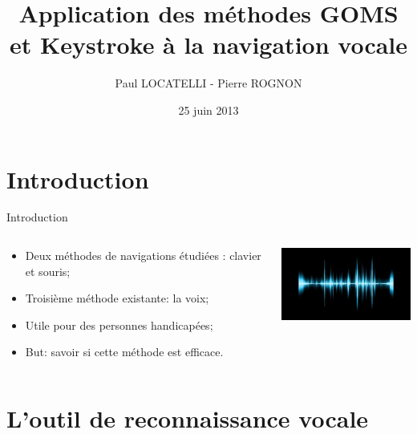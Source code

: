\documentclass{beamer}
\title[Navigation vocale]{Application des méthodes GOMS et
Keystroke à la navigation vocale}
\author[]{Paul LOCATELLI - Pierre ROGNON}
\institute[UTBM]{Université de Technologies de Belfort-Montbéliard}
\date{25 juin 2013}
\begin{document}
\begin{frame}{}
	
	\maketitle	
	
\end{frame}

	\section*{Introduction}

\begin{frame}{Introduction}


	\begin{columns}[c]
	
	\begin{column}{5cm}
   		\begin{itemize}
			\item Deux méthodes de navigations étudiées : clavier et souris;
			\item Troisième méthode existante: la voix;
			\item Utile pour des personnes handicapées;
			\item But: savoir si cette méthode est efficace.
		\end{itemize}
  	\end{column}
	\begin{column}{5cm}
		\includegraphics[width=5cm]{reconnaissance-vocale}
  	\end{column}
	
	\end{columns}
    	
\end{frame}

	\section{L'outil de reconnaissance vocale}
	
\end{document}
